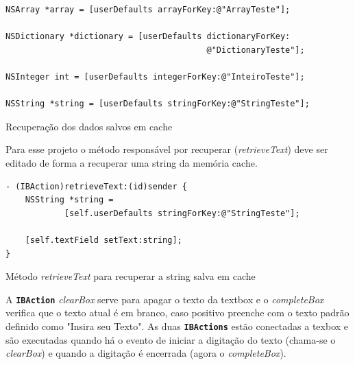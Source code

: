\documentclass[a4paper,12pt,brazil,doubleside]{book}
\begin{document}
\begin{singlespace}
\begin{listing}[H]
\begin{verbatim}
NSArray *array = [userDefaults arrayForKey:@"ArrayTeste"];

NSDictionary *dictionary = [userDefaults dictionaryForKey:
                                         @"DictionaryTeste"];

NSInteger int = [userDefaults integerForKey:@"InteiroTeste"];

NSString *string = [userDefaults stringForKey:@"StringTeste"];
\end{verbatim}
\caption{Recuperação dos dados salvos em cache}
\end{listing}


Para esse projeto o método responsável por recuperar (\emph{retrieveText}) deve ser editado de forma a recuperar uma string da memória cache.

\begin{listing}[H]
\begin{verbatim}
- (IBAction)retrieveText:(id)sender {
    NSString *string = 
    		[self.userDefaults stringForKey:@"StringTeste"];
    
    [self.textField setText:string];
}
\end{verbatim}
\caption{Método \emph{retrieveText} para recuperar a string salva em cache}
\end{listing}


A  \texttt{\textbf{IBAction}} \emph{clearBox} serve para apagar o texto da textbox e o \emph{completeBox} verifica que o texto atual é em branco, caso positivo preenche com o texto padrão definido como "Insira seu Texto".
As duas \texttt{\textbf{IBActions}} estão conectadas a texbox e são executadas quando há o evento de iniciar a digitação do texto (chama-se o \emph{clearBox}) e quando a digitação é encerrada (agora o \emph{completeBox}).


\end{singlespace}
\end{document}
